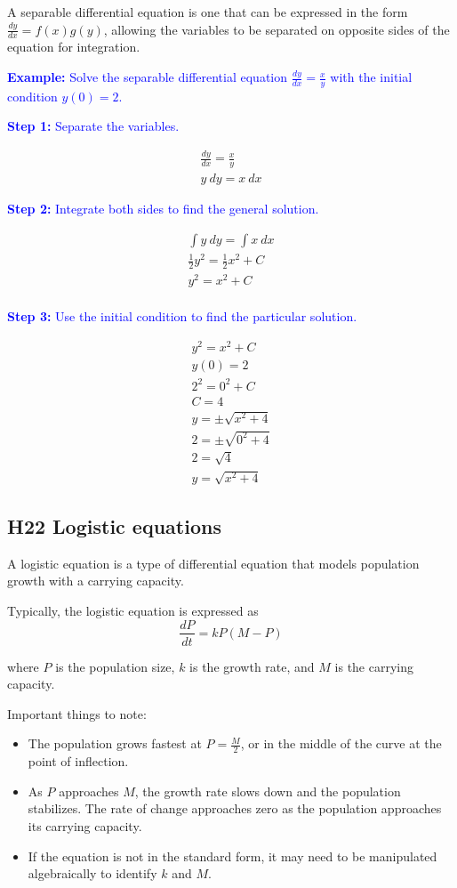 \documentclass[letterpaper, 12pt]{article}
\newcommand{\example}[1]{\textcolor{blue}{\textbf{Example:} #1}}
\newcommand{\step}[2]{\textcolor{blue}{\textbf{Step #1:} #2}}
\begin{document}
A separable differential equation is one that can be expressed in the form $\frac{dy}{dx} = f(x)g(y)$, allowing the variables to be separated on opposite sides of the equation for integration.

\example{Solve the separable differential equation $\displaystyle \frac{dy}{dx} = \frac{x}{y}$ with the initial condition $y(0) = 2$.}

\step{1}{Separate the variables.}

\begin{gather*}
\frac{dy}{dx} = \frac{x}{y} \\
y \: dy = x \: dx
\end{gather*}

\step{2}{Integrate both sides to find the general solution.}

\begin{gather*}
\int y \: dy = \int x \: dx \\
\frac{1}{2} y^2 = \frac{1}{2} x^2 + C \\
y^2 = x^2 + C \\
\end{gather*}

\step{3}{Use the initial condition to find the particular solution.}

\begin{gather*}
y^2 = x^2 + C\\
y(0) = 2 \\
2^2 = 0^2 + C \\
C = 4 \\
y = \pm \sqrt{x^2+4} \\
2 = \pm \sqrt{0^2 + 4} \\
2 = \sqrt{4} \\
\boxed{y = \sqrt{x^2 + 4}}
\end{gather*}

\subsection*{H22 Logistic equations}

A logistic equation is a type of differential equation that models population growth with a carrying capacity.

Typically, the logistic equation is expressed as $$\frac{dP}{dt} = kP(M-P)$$

where $P$ is the population size, $k$ is the growth rate, and $M$ is the carrying capacity.

Important things to note:
\begin{itemize}
\item The population grows fastest at $P = \displaystyle \frac{M}{2}$, or in the middle of the curve at the point of inflection.
\item As $P$ approaches $M$, the growth rate slows down and the population stabilizes. The rate of change approaches zero as the population approaches its carrying capacity.
\item If the equation is not in the standard form, it may need to be manipulated algebraically to identify $k$ and $M$.
\end{itemize}
\end{document}
